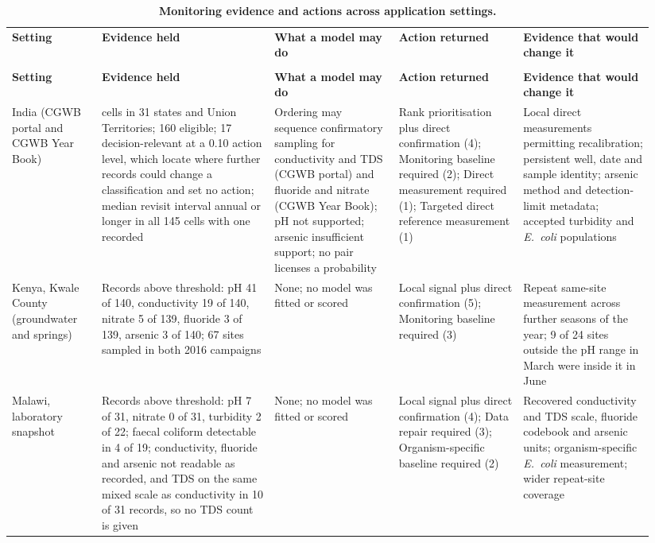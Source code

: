 \documentclass[10pt,letterpaper]{article}
\newlength\savedwidth
\newcommand\thickhline{\noalign{\global\savedwidth\arrayrulewidth\global\arrayrulewidth 2pt}%
\hline
\noalign{\global\arrayrulewidth\savedwidth}}
\begin{document}
{\footnotesize\setlength{\tabcolsep}{3pt}\setlength{\LTcapwidth}{\linewidth}
\begin{longtable}{>{\raggedright\arraybackslash}p{0.1323\linewidth}>{\raggedright\arraybackslash}p{0.2523\linewidth}>{\raggedright\arraybackslash}p{0.1800\linewidth}>{\raggedright\arraybackslash}p{0.1800\linewidth}>{\raggedright\arraybackslash}p{0.1923\linewidth}}
\caption{\textbf{Monitoring evidence and actions across application settings.}}\label{table4} \\
\hline
\textbf{Setting} & \textbf{Evidence held} & \textbf{What a model may do} & \textbf{Action returned} & \textbf{Evidence that would change it} \\ \thickhline
\endfirsthead
\multicolumn{5}{@{}l}{\footnotesize\emph{Table 4. (continued)}} \\
\hline
\textbf{Setting} & \textbf{Evidence held} & \textbf{What a model may do} & \textbf{Action returned} & \textbf{Evidence that would change it} \\ \thickhline
\endhead
India (CGWB portal and CGWB Year Book) & 186 cells in 31 states and Union Territories; 160 eligible; 17 decision-relevant at a 0.10 action level, which locate where further records could change a classification and set no action; median revisit interval annual or longer in all 145 cells with one recorded & Ordering may sequence confirmatory sampling for conductivity and TDS (CGWB portal) and fluoride and nitrate (CGWB Year Book); pH not supported; arsenic insufficient support; no pair licenses a probability & Rank prioritisation plus direct confirmation (4); Monitoring baseline required (2); Direct measurement required (1); Targeted direct reference measurement (1) & Local direct measurements permitting recalibration; persistent well, date and sample identity; arsenic method and detection-limit metadata; accepted turbidity and \textit{E.~coli} populations \\ \hline
Kenya, Kwale County (groundwater and springs) & Records above threshold: pH 41 of 140, conductivity 19 of 140, nitrate 5 of 139, fluoride 3 of 139, arsenic 3 of 140; 67 sites sampled in both 2016 campaigns & None; no model was fitted or scored & Local signal plus direct confirmation (5); Monitoring baseline required (3) & Repeat same-site measurement across further seasons of the year; 9 of 24 sites outside the pH range in March were inside it in June \\ \hline
Malawi, laboratory snapshot & Records above threshold: pH 7 of 31, nitrate 0 of 31, turbidity 2 of 22; faecal coliform detectable in 4 of 19; conductivity, fluoride and arsenic not readable as recorded, and TDS on the same mixed scale as conductivity in 10 of 31 records, so no TDS count is given & None; no model was fitted or scored & Local signal plus direct confirmation (4); Data repair required (3); Organism-specific baseline required (2) & Recovered conductivity and TDS scale, fluoride codebook and arsenic units; organism-specific \textit{E.~coli} measurement; wider repeat-site coverage \\ \hline

\end{longtable}}
\end{document}
